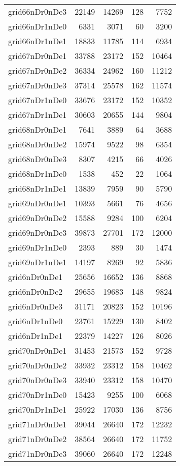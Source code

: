 \begin{longtable}{lrrrr}
grid66nDr0nDe3 & 22149 & 14269 & 128 & 7752 \\
grid66nDr1nDe0 & 6331 & 3071 & 60 & 3200 \\
grid66nDr1nDe1 & 18833 & 11785 & 114 & 6934 \\
grid67nDr0nDe1 & 33788 & 23172 & 152 & 10464 \\
grid67nDr0nDe2 & 36334 & 24962 & 160 & 11212 \\
grid67nDr0nDe3 & 37314 & 25578 & 162 & 11574 \\
grid67nDr1nDe0 & 33676 & 23172 & 152 & 10352 \\
grid67nDr1nDe1 & 30603 & 20655 & 144 & 9804 \\
grid68nDr0nDe1 & 7641 & 3889 & 64 & 3688 \\
grid68nDr0nDe2 & 15974 & 9522 & 98 & 6354 \\
grid68nDr0nDe3 & 8307 & 4215 & 66 & 4026 \\
grid68nDr1nDe0 & 1538 & 452 & 22 & 1064 \\
grid68nDr1nDe1 & 13839 & 7959 & 90 & 5790 \\
grid69nDr0nDe1 & 10393 & 5661 & 76 & 4656 \\
grid69nDr0nDe2 & 15588 & 9284 & 100 & 6204 \\
grid69nDr0nDe3 & 39873 & 27701 & 172 & 12000 \\
grid69nDr1nDe0 & 2393 & 889 & 30 & 1474 \\
grid69nDr1nDe1 & 14197 & 8269 & 92 & 5836 \\
grid6nDr0nDe1 & 25656 & 16652 & 136 & 8868 \\
grid6nDr0nDe2 & 29655 & 19683 & 148 & 9824 \\
grid6nDr0nDe3 & 31171 & 20823 & 152 & 10196 \\
grid6nDr1nDe0 & 23761 & 15229 & 130 & 8402 \\
grid6nDr1nDe1 & 22379 & 14227 & 126 & 8026 \\
grid70nDr0nDe1 & 31453 & 21573 & 152 & 9728 \\
grid70nDr0nDe2 & 33932 & 23312 & 158 & 10462 \\
grid70nDr0nDe3 & 33940 & 23312 & 158 & 10470 \\
grid70nDr1nDe0 & 15423 & 9255 & 100 & 6068 \\
grid70nDr1nDe1 & 25922 & 17030 & 136 & 8756 \\
grid71nDr0nDe1 & 39044 & 26640 & 172 & 12232 \\
grid71nDr0nDe2 & 38564 & 26640 & 172 & 11752 \\
grid71nDr0nDe3 & 39060 & 26640 & 172 & 12248 \\

\end{longtable}
